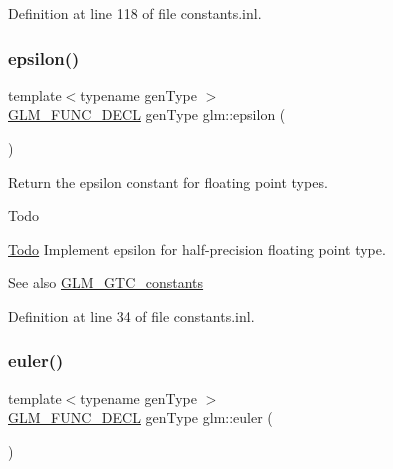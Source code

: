 Definition at line 118 of file constants.\+inl.

\mbox{\label{group__gtc__constants_gacb41049b8d22c8aa90e362b96c524feb}} 
\subsubsection{\texorpdfstring{epsilon()}{epsilon()}}
{\footnotesize\ttfamily template$<$typename gen\+Type $>$ \\
\hyperlink{setup_8hpp_ab2d052de21a70539923e9bcbf6e83a51}{G\+L\+M\+\_\+\+F\+U\+N\+C\+\_\+\+D\+E\+CL} gen\+Type glm\+::epsilon (\begin{DoxyParamCaption}{ }\end{DoxyParamCaption})}

Return the epsilon constant for floating point types. \begin{DoxyRefDesc}{Todo}
\item[\hyperlink{todo__todo000007}{Todo}]Implement epsilon for half-\/precision floating point type. \end{DoxyRefDesc}
\begin{DoxySeeAlso}{See also}
\hyperlink{group__gtc__constants}{G\+L\+M\+\_\+\+G\+T\+C\+\_\+constants} 
\end{DoxySeeAlso}


Definition at line 34 of file constants.\+inl.

\mbox{\label{group__gtc__constants_ga6f14b46653b7ead1edcbd0fc6c9c5289}} 
\subsubsection{\texorpdfstring{euler()}{euler()}}
{\footnotesize\ttfamily template$<$typename gen\+Type $>$ \\
\hyperlink{setup_8hpp_ab2d052de21a70539923e9bcbf6e83a51}{G\+L\+M\+\_\+\+F\+U\+N\+C\+\_\+\+D\+E\+CL} gen\+Type glm\+::euler (\begin{DoxyParamCaption}{ }\end{DoxyParamCaption})}


